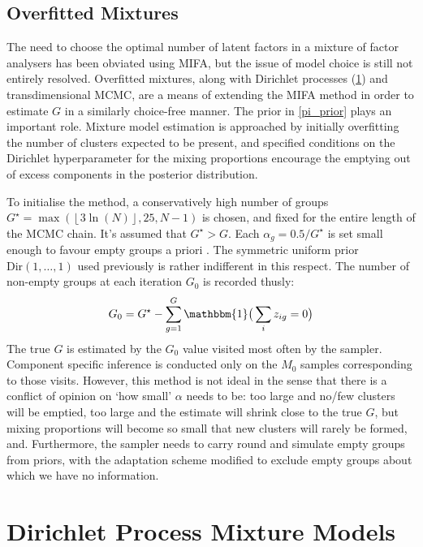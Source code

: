 \documentclass[a4paper,12pt,fleqn]{article}
\numberwithin{equation}{section}
\begin{document}
\subsection[Overfitted Mixtures]{Overfitted Mixtures}
The need to choose the optimal number of latent factors in a mixture of factor analysers has been obviated using MIFA, but the issue of model choice is still not entirely resolved. Overfitted mixtures, along with Dirichlet processes (\ref{Dirichlet}) and transdimensional MCMC, are a means of extending the MIFA method in order to estimate $G$ in a similarly choice-free manner. The prior in \ref{pi_prior}  plays an important role. Mixture model estimation is approached by initially overfitting the number of clusters expected to be present, and specified conditions on the Dirichlet hyperparameter for the  mixing proportions encourage the emptying out of excess components in the posterior distribution. 

To initialise the method, a conservatively high number of groups $G^\star = \max\left(\left\lfloor 3\ln(N)\right\rfloor, 25, N-1\right)$ is chosen, and fixed for the entire length of the MCMC chain. It's assumed that $G^\star > G$. Each $\alpha_g = 0.5/G^\star$ is set small enough to favour empty groups a priori \cite{Ishwaran2001}. The symmetric uniform prior $\textrm{Dir}\left(1,\ldots,1\right)$ used previously is rather indifferent in this respect. The number of non-empty groups at each iteration $G_0$ is recorded thusly:
\begin{equation}
	G_0 = G^{\star} - \sum_{g=1}^{G} \mathbbm{1}\big(\sum\limits_{i} z_{ig}=0\big)\label{eq:34}
\end{equation}
\label{overfitted}
The true $G$ is estimated by the $G_0$ value visited most often by the sampler. Component specific inference is conducted only on the $M_0$ samples corresponding to those visits. However, this method is not ideal in the sense that there is a conflict of opinion on `how small' $\alpha$ needs to be: too large and no/few clusters will be emptied, too large and the estimate will shrink close to the true $G$, but mixing proportions will become so small that new clusters will rarely be formed, and. Furthermore, the sampler needs to carry round and simulate empty groups from priors, with the adaptation scheme modified to exclude empty groups about which we have no information.

\section[Dirichlet Process Mixture Models]{Dirichlet Process Mixture Models}
\label{Dirichlet}
\end{document}
